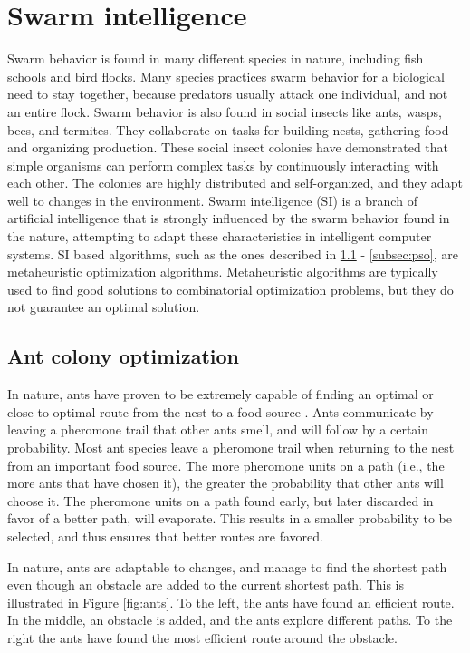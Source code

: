 \section{Swarm intelligence}
\label{sec:swarmIntelligence}
Swarm behavior is found in many different species in nature, including fish schools and bird flocks. Many species practices swarm behavior for a biological need to stay together, because predators usually attack one individual, and not an entire flock. Swarm behavior is also found in social insects like ants, wasps, bees, and termites. They collaborate on tasks for building nests, gathering food and organizing production. These social insect colonies have demonstrated that simple organisms can perform complex tasks by continuously interacting with each other. The colonies are highly distributed and self-organized, and they adapt well to changes in the environment. Swarm intelligence (SI) \citep{beni89} is a branch of artificial intelligence that is strongly influenced by the swarm behavior found in the nature, attempting to adapt these characteristics in intelligent computer systems. SI based algorithms, such as the ones described in \ref{subsec:aco} - \ref{subsec:pso}, are metaheuristic optimization algorithms. Metaheuristic algorithms are typically used to find good solutions to combinatorial optimization problems, but they do not guarantee an optimal solution.  

\subsection{Ant colony optimization}
\label{subsec:aco}
In nature, ants have proven to be extremely capable of finding an optimal or close to optimal route from the nest to a food source \citep{deneubourg90}. Ants communicate by leaving a pheromone trail that other ants smell, and will follow by a certain probability. Most ant species leave a pheromone trail when returning to the nest from an important food source. The more pheromone units on a path (i.e., the more ants that have chosen it), the greater the probability that other ants will choose it. The pheromone units on a path found early, but later discarded in favor of a better path, will evaporate. This results in a smaller probability to be selected, and thus ensures that better routes are favored.

In nature, ants are adaptable to changes, and manage to find the shortest path even though an obstacle are added to the current shortest path. This is illustrated in Figure \ref{fig:ants}. To the left, the ants have found an efficient route. In the middle, an obstacle is added, and the ants explore different paths. To the right the ants have found the most efficient route around the obstacle.

